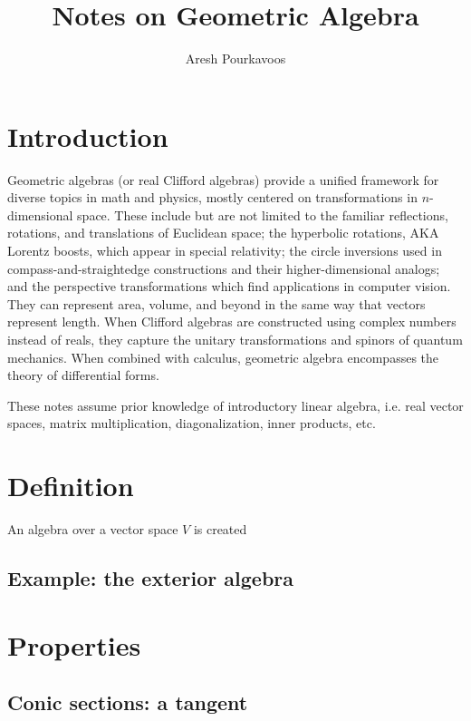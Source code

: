 \documentclass{article}
\begin{document}
\title{Notes on Geometric Algebra}
\author{Aresh Pourkavoos}
\date{}
\maketitle

\tableofcontents

\section{Introduction}
Geometric algebras (or real Clifford algebras) provide a unified framework
for diverse topics in math and physics,
mostly centered on transformations in $n$-dimensional space.
These include but are not limited to
the familiar reflections, rotations, and translations of Euclidean space;
the hyperbolic rotations, AKA Lorentz boosts, which appear in special relativity;
the circle inversions used in compass-and-straightedge constructions
and their higher-dimensional analogs;
and the perspective transformations which find applications in computer vision.
They can represent area, volume, and beyond
in the same way that vectors represent length.
When Clifford algebras are constructed using complex numbers instead of reals,
they capture the unitary transformations and spinors of quantum mechanics.
When combined with calculus, geometric algebra encompasses the theory of differential forms.

These notes assume prior knowledge of introductory linear algebra,
i.e. real vector spaces, matrix multiplication,
diagonalization, inner products, etc.

\section{Definition}

An algebra over a vector space $V$ is created

\subsection{Example: the exterior algebra}

\section{Properties}

\subsection{Conic sections: a tangent}
\end{document}
